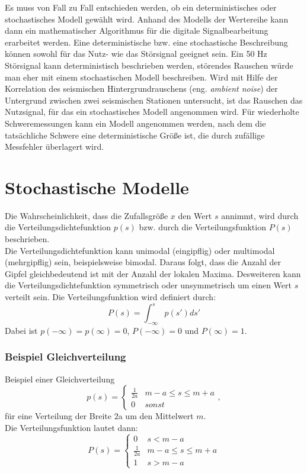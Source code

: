 Es muss von Fall zu Fall entschieden werden, ob ein deterministisches oder stochastisches Modell gewählt wird. Anhand des Modells der Wertereihe kann dann ein mathematischer Algorithmus für die digitale Signalbearbeitung erarbeitet werden. Eine deterministische bzw. eine stochastische Beschreibung können sowohl für das Nutz- wie das Störsignal geeignet sein. Ein 50 Hz Störsignal kann deterministisch beschrieben werden, störendes Rauschen würde man eher mit einem stochastischen Modell beschreiben. Wird mit Hilfe der Korrelation des seismischen Hintergrundrauschens (eng. \textsl{ambient noise}) der Untergrund zwischen zwei seismischen Stationen untersucht, ist das Rauschen das Nutzsignal, für das ein stochastisches Modell angenommen wird. Für wiederholte Schweremessungen kann ein Modell angenommen werden, nach dem die tatsächliche Schwere eine deterministische Größe ist, die durch zufällige Messfehler überlagert wird. 

\section{Stochastische Modelle}
Die Wahrscheinlichkeit, dass die Zufallsgröße $x$ den Wert $s$ annimmt, wird durch die  Verteilungsdichtefunktion $p(s)$ bzw. durch die Verteilungsfunktion $P(s)$ be\-schrieben.\\
Die Verteilungsdichtefunktion kann unimodal (eingipflig) oder multimodal (mehrgipflig) sein, beispielsweise bimodal. Daraus folgt, dass die Anzahl der Gipfel gleichbedeutend ist mit der Anzahl der lokalen Maxima. Desweiteren kann die Verteilungsdichtefunktion symmetrisch oder unsymmetrisch um einen Wert $s$ verteilt sein. Die Verteilungsfunktion wird definiert durch:
\begin{equation}
P(s)=\int_{-\infty}^s p(s')ds'
\end{equation}
Dabei ist $p(-\infty)=p(\infty)=0$, $P(-\infty)=0$ und $P(\infty)=1$.

\subsubsection*{Beispiel Gleichverteilung}
Beispiel einer Gleichverteilung
\begin{equation}
p(s)=
\begin{cases}
  \frac{1}{2a} & m-a \leq s\leq m+a\\
 0 & sonst
\end{cases},
\end{equation}
für eine Verteilung der Breite $2$a um den Mittelwert $m$.\\
Die Verteilungsfunktion lautet dann:
\[
P(s)=
\begin{cases}
0 &  s<m-a\\
\frac{1}{2a} & m-a\leq s\leq m+a\\
1 & s>m-a
\end{cases}
\]

